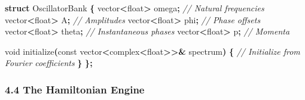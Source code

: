 \documentclass[
  11pt,
  a4paper,
]{article}
\newenvironment{Shaded}{\begin{snugshade}}{\end{snugshade}}
\newcommand{\AttributeTok}[1]{\textcolor[rgb]{0.13,0.29,0.53}{#1}}
\newcommand{\CommentTok}[1]{\textcolor[rgb]{0.56,0.35,0.01}{\textit{#1}}}
\newcommand{\DataTypeTok}[1]{\textcolor[rgb]{0.13,0.29,0.53}{#1}}
\newcommand{\KeywordTok}[1]{\textcolor[rgb]{0.13,0.29,0.53}{\textbf{#1}}}
\newcommand{\NormalTok}[1]{#1}
\newcommand{\OperatorTok}[1]{\textcolor[rgb]{0.81,0.36,0.00}{\textbf{#1}}}
\begin{document}
\begin{Shaded}
\begin{Highlighting}[]
\KeywordTok{struct}\NormalTok{ OscillatorBank }\OperatorTok{\{}
\NormalTok{    vector}\OperatorTok{\textless{}}\DataTypeTok{float}\OperatorTok{\textgreater{}}\NormalTok{ omega}\OperatorTok{;}   \CommentTok{// Natural frequencies}
\NormalTok{    vector}\OperatorTok{\textless{}}\DataTypeTok{float}\OperatorTok{\textgreater{}}\NormalTok{ A}\OperatorTok{;}       \CommentTok{// Amplitudes}
\NormalTok{    vector}\OperatorTok{\textless{}}\DataTypeTok{float}\OperatorTok{\textgreater{}}\NormalTok{ phi}\OperatorTok{;}     \CommentTok{// Phase offsets}
\NormalTok{    vector}\OperatorTok{\textless{}}\DataTypeTok{float}\OperatorTok{\textgreater{}}\NormalTok{ theta}\OperatorTok{;}   \CommentTok{// Instantaneous phases}
\NormalTok{    vector}\OperatorTok{\textless{}}\DataTypeTok{float}\OperatorTok{\textgreater{}}\NormalTok{ p}\OperatorTok{;}       \CommentTok{// Momenta}
    
    \DataTypeTok{void}\NormalTok{ initialize}\OperatorTok{(}\AttributeTok{const}\NormalTok{ vector}\OperatorTok{\textless{}}\NormalTok{complex}\OperatorTok{\textless{}}\DataTypeTok{float}\OperatorTok{\textgreater{}\textgreater{}\&}\NormalTok{ spectrum}\OperatorTok{)} \OperatorTok{\{}
        \CommentTok{// Initialize from Fourier coefficients}
    \OperatorTok{\}}
\OperatorTok{\};}
\end{Highlighting}
\end{Shaded}

\subsubsection{4.4 The Hamiltonian Engine}\label{the-hamiltonian-engine}
\end{document}

